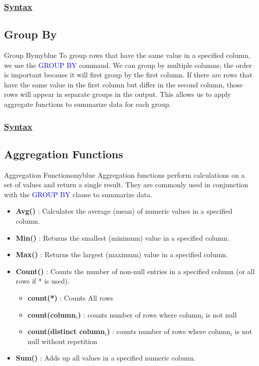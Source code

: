 \subsubsection*{\underline{Syntax}}



\subsection{Group By} 
\begin{prettyBox}{Group By}{myblue}
To group rows that have the same value in a specified column, we use the \textcolor{blue}{GROUP BY} command.
We can group by multiple columns; the order is important because it will first group by the first column. If there
are rows that have the same value in the first column but differ in the second column, those rows will appear in
separate groups in the output. This allows us to apply aggregate functions to summarize data for each group.
\end{prettyBox}

\subsubsection*{\underline{Syntax}}



 \subsection{Aggregation Functions}
 \begin{prettyBox}{Aggregation Functions}{myblue}
   Aggregation functions perform calculations on a set of values and return a single result. They are commonly used in conjunction with the \textcolor{blue}{GROUP BY} clause to summarize data.
   \begin{itemize}
    \item \textbf{Avg()} : Calculates the average (mean) of numeric values in a specified column.
    \item \textbf{Min()} : Returns the smallest (minimum) value in a specified column.
    \item \textbf{Max()} : Returns the largest (maximum) value in a specified column.
    \item \textbf{Count()} : Counts the number of non-null entries in a specified column (or all rows if * is used).
      \begin{itemize}
        \item  \textbf{count(*)} : Counts All rows
        \item  \textbf{count(column$_{i}$)} : counts number of rows where column$_{i}$ is not null
        \item  \textbf{count(distinct column$_{i}$)} : counts number of rows where column$_{i}$ is not null without repetition
    \end{itemize}
    \item \textbf{Sum()} : Adds up all values in a specified numeric column.
   \end{itemize} 
\end{prettyBox}



